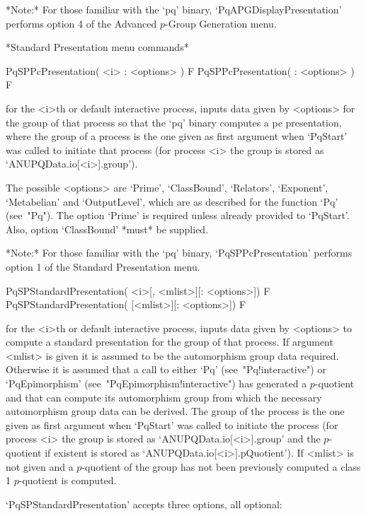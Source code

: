 *Note:*
For those  familiar  with  the  `pq'  binary,  `PqAPGDisplayPresentation'
performs option 4 of the Advanced $p$-Group Generation menu.

*Standard Presentation menu commands*

\>PqSPPcPresentation( <i> : <options> ) F
\>PqSPPcPresentation( : <options> ) F

for the <i>th or default interactive {\ANUPQ} process, inputs data  given
by <options> for the group of  that  process  so  that  the  `pq'  binary
computes a pc presentation, where the group of a process is the one given
as first argument when `PqStart' was called to initiate that process (for
process <i> the group is stored as `ANUPQData.io[<i>].group').

The possible <options> are `Prime', `ClassBound', `Relators', `Exponent',
`Metabelian' and `OutputLevel', which are as described for  the  function
`Pq' (see~"Pq"). The option `Prime' is required unless  already  provided
to `PqStart'. Also, option `ClassBound' *must* be supplied.

*Note:* For those familiar with  the  `pq'  binary,  `PqSPPcPresentation'
performs option 1 of the Standard Presentation menu.

\>PqSPStandardPresentation( <i>[, <mlist>][: <options>]) F
\>PqSPStandardPresentation( [<mlist>][: <options>]) F

for the <i>th or default interactive {\ANUPQ} process, inputs data  given
by <options> to compute a standard presentation for  the  group  of  that
process.  If  argument  <mlist>  is  given  it  is  assumed  to  be   the
automorphism group data required. Otherwise it is assumed that a call  to
either      `Pq'      (see~"Pq!interactive")      or      `PqEpimorphism'
(see~"PqEpimorphism!interactive") has generated a $p$-quotient  and  that
{\GAP} can compute  its  automorphism  group  from  which  the  necessary
automorphism group data can be derived. The group of the process  is  the
one given as first argument when `PqStart' was  called  to  initiate  the
process (for process <i> the group is stored as `ANUPQData.io[<i>].group'
and     the     $p$-quotient     if     existent     is     stored     as
`ANUPQData.io[<i>].pQuotient').  If  <mlist>   is   not   given   and   a
$p$-quotient of the group has not been  previously  computed  a  class  1
$p$-quotient is computed.

`PqSPStandardPresentation' accepts three options, all optional:

\beginitems

